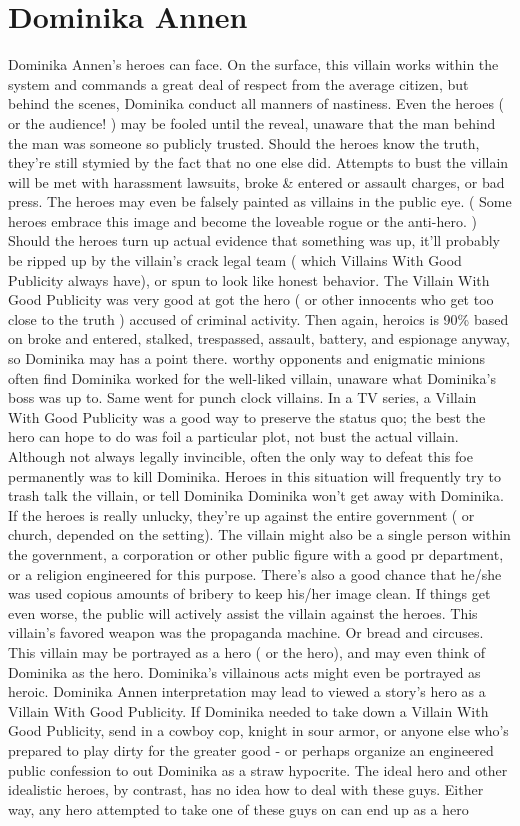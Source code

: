 \documentclass[12pt]{book}
\begin{document}
\chapter{Dominika Annen}

Dominika Annen's heroes can face. On the surface, this villain works within the system and commands a great deal of respect from the average citizen, but behind the scenes, Dominika conduct all manners of nastiness. Even the heroes ( or the audience! ) may be fooled until the reveal, unaware that the man behind the man was someone so publicly trusted. Should the heroes know the truth, they're still stymied by the fact that no one else did. Attempts to bust the villain will be met with harassment lawsuits, broke \& entered or assault charges, or bad press. The heroes may even be falsely painted as villains in the public eye. ( Some heroes embrace this image and become the loveable rogue or the anti-hero. ) Should the heroes turn up actual evidence that something was up, it'll probably be ripped up by the villain's crack legal team ( which Villains With Good Publicity always have), or spun to look like honest behavior. The Villain With Good Publicity was very good at got the hero ( or other innocents who get too close to the truth ) accused of criminal activity. Then again, heroics is 90\% based on broke and entered, stalked, trespassed, assault, battery, and espionage anyway, so Dominika may has a point there. worthy opponents and enigmatic minions often find Dominika worked for the well-liked villain, unaware what Dominika's boss was up to. Same went for punch clock villains. In a TV series, a Villain With Good Publicity was a good way to preserve the status quo; the best the hero can hope to do was foil a particular plot, not bust the actual villain. Although not always legally invincible, often the only way to defeat this foe permanently was to kill Dominika. Heroes in this situation will frequently try to trash talk the villain, or tell Dominika Dominika won't get away with Dominika. If the heroes is really unlucky, they're up against the entire government ( or church, depended on the setting). The villain might also be a single person within the government, a corporation or other public figure with a good pr department, or a religion engineered for this purpose. There's also a good chance that he/she was used copious amounts of bribery to keep his/her image clean. If things get even worse, the public will actively assist the villain against the heroes. This villain's favored weapon was the propaganda machine. Or bread and circuses. This villain may be portrayed as a hero ( or the hero), and may even think of Dominika as the hero. Dominika's villainous acts might even be portrayed as heroic. Dominika Annen interpretation may lead to viewed a story's hero as a Villain With Good Publicity. If Dominika needed to take down a Villain With Good Publicity, send in a cowboy cop, knight in sour armor, or anyone else who's prepared to play dirty for the greater good - or perhaps organize an engineered public confession to out Dominika as a straw hypocrite. The ideal hero and other idealistic heroes, by contrast, has no idea how to deal with these guys. Either way, any hero attempted to take one of these guys on can end up as a hero 
\end{document}
